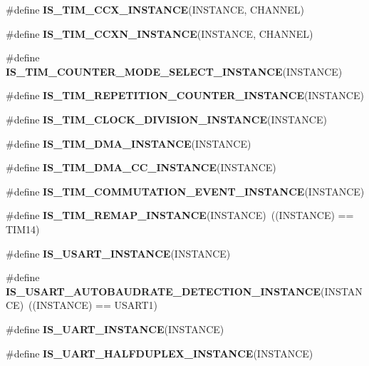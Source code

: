 \begin{DoxyCompactItemize}
\item 
\#define {\bfseries I\+S\+\_\+\+T\+I\+M\+\_\+\+C\+C\+X\+\_\+\+I\+N\+S\+T\+A\+N\+CE}(I\+N\+S\+T\+A\+N\+CE,  C\+H\+A\+N\+N\+EL)
\item 
\#define {\bfseries I\+S\+\_\+\+T\+I\+M\+\_\+\+C\+C\+X\+N\+\_\+\+I\+N\+S\+T\+A\+N\+CE}(I\+N\+S\+T\+A\+N\+CE,  C\+H\+A\+N\+N\+EL)
\item 
\#define {\bfseries I\+S\+\_\+\+T\+I\+M\+\_\+\+C\+O\+U\+N\+T\+E\+R\+\_\+\+M\+O\+D\+E\+\_\+\+S\+E\+L\+E\+C\+T\+\_\+\+I\+N\+S\+T\+A\+N\+CE}(I\+N\+S\+T\+A\+N\+CE)
\item 
\#define {\bfseries I\+S\+\_\+\+T\+I\+M\+\_\+\+R\+E\+P\+E\+T\+I\+T\+I\+O\+N\+\_\+\+C\+O\+U\+N\+T\+E\+R\+\_\+\+I\+N\+S\+T\+A\+N\+CE}(I\+N\+S\+T\+A\+N\+CE)
\item 
\#define {\bfseries I\+S\+\_\+\+T\+I\+M\+\_\+\+C\+L\+O\+C\+K\+\_\+\+D\+I\+V\+I\+S\+I\+O\+N\+\_\+\+I\+N\+S\+T\+A\+N\+CE}(I\+N\+S\+T\+A\+N\+CE)
\item 
\#define {\bfseries I\+S\+\_\+\+T\+I\+M\+\_\+\+D\+M\+A\+\_\+\+I\+N\+S\+T\+A\+N\+CE}(I\+N\+S\+T\+A\+N\+CE)
\item 
\#define {\bfseries I\+S\+\_\+\+T\+I\+M\+\_\+\+D\+M\+A\+\_\+\+C\+C\+\_\+\+I\+N\+S\+T\+A\+N\+CE}(I\+N\+S\+T\+A\+N\+CE)
\item 
\#define {\bfseries I\+S\+\_\+\+T\+I\+M\+\_\+\+C\+O\+M\+M\+U\+T\+A\+T\+I\+O\+N\+\_\+\+E\+V\+E\+N\+T\+\_\+\+I\+N\+S\+T\+A\+N\+CE}(I\+N\+S\+T\+A\+N\+CE)
\item 
\mbox{\label{group___exported__macro_ga6bb03cf116b07bfe1bd527f8ab61a7f9}} 
\#define {\bfseries I\+S\+\_\+\+T\+I\+M\+\_\+\+R\+E\+M\+A\+P\+\_\+\+I\+N\+S\+T\+A\+N\+CE}(I\+N\+S\+T\+A\+N\+CE)~((I\+N\+S\+T\+A\+N\+CE) == T\+I\+M14)
\item 
\#define {\bfseries I\+S\+\_\+\+U\+S\+A\+R\+T\+\_\+\+I\+N\+S\+T\+A\+N\+CE}(I\+N\+S\+T\+A\+N\+CE)
\item 
\mbox{\label{group___exported__macro_ga4130cef42f8cada5a91c38b85f76939e}} 
\#define {\bfseries I\+S\+\_\+\+U\+S\+A\+R\+T\+\_\+\+A\+U\+T\+O\+B\+A\+U\+D\+R\+A\+T\+E\+\_\+\+D\+E\+T\+E\+C\+T\+I\+O\+N\+\_\+\+I\+N\+S\+T\+A\+N\+CE}(I\+N\+S\+T\+A\+N\+CE)~((I\+N\+S\+T\+A\+N\+CE) == U\+S\+A\+R\+T1)
\item 
\#define {\bfseries I\+S\+\_\+\+U\+A\+R\+T\+\_\+\+I\+N\+S\+T\+A\+N\+CE}(I\+N\+S\+T\+A\+N\+CE)
\item 
\#define {\bfseries I\+S\+\_\+\+U\+A\+R\+T\+\_\+\+H\+A\+L\+F\+D\+U\+P\+L\+E\+X\+\_\+\+I\+N\+S\+T\+A\+N\+CE}(I\+N\+S\+T\+A\+N\+CE)

\end{DoxyCompactItemize}
